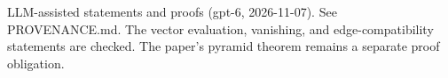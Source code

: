 \documentclass[11pt]{article}
\begin{document}

\bigskip
{\footnotesize LLM-assisted statements and proofs (gpt-6, 2026-11-07).
See PROVENANCE.md. The vector evaluation, vanishing, and edge-compatibility statements are checked.
The paper's pyramid theorem remains a separate proof obligation.}
\end{document}
